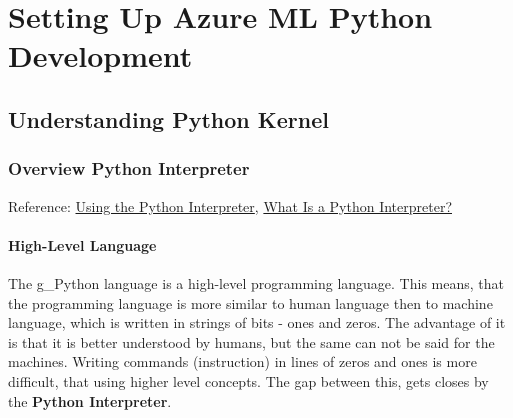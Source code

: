 \section{Setting Up Azure ML Python Development}\label{sec:PythonDevEnv}
\subsection{Understanding Python Kernel}
\subsubsection{Overview Python Interpreter}
Reference: \href{https://docs.python.org/3/tutorial/interpreter.html#the-interpreter-and-its-environment}{Using the Python Interpreter}, \href{https://blog.hubspot.com/website/what-is-python-interpreter#:~:text=A%20python%20interpreter%20is%20a,and%20low%2Dlevel%20languages%20are.}{What Is a Python Interpreter?}\\

\paragraph{High-Level Language}
The \gls{g_Python} language is a high-level programming language. This means, that the programming language is more similar to human language then to machine language, which is written in strings of bits - ones and zeros.
The advantage of it is that it is better understood by humans, but the same can not be said for the machines. Writing commands (instruction) in lines of zeros and ones is more difficult, that using higher level concepts. The gap between this, gets closes by the \textbf{Python Interpreter}.\\

